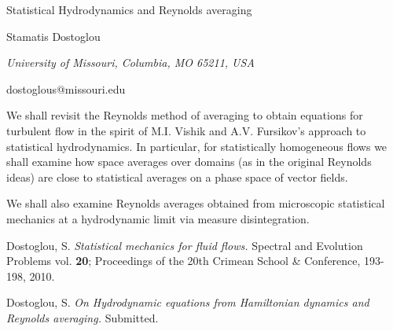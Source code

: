 \documentclass[10pt,a4paper]{article}
\begin{document}
\begin{center}

{\Large Statistical Hydrodynamics and Reynolds averaging}

\bigskip

{\sc Stamatis Dostoglou}

{\small\it University of Missouri, Columbia, MO 65211, USA}

{\small\rm dostoglous@missouri.edu}


\end{center}

\bigskip


We shall revisit the Reynolds method of averaging to obtain equations
for turbulent flow in the spirit of M.I. Vishik and A.V. Fursikov's approach to statistical hydrodynamics. In particular, 
for statistically homogeneous flows we shall examine how space averages over domains (as in the original Reynolds ideas) are close to statistical averages on a phase space of vector fields.

We shall also examine Reynolds averages obtained from microscopic statistical mechanics at a hydrodynamic limit via measure disintegration.

\begin{thebibliography}{7}

Dostoglou, S.
{\em Statistical mechanics for fluid flows.} 
Spectral and Evolution
Problems  vol. {\bf 20}; Proceedings of the 20th Crimean School \& Conference, 193-198, 2010.

Dostoglou, S.
{\em On Hydrodynamic equations from Hamiltonian dynamics
and 
Reynolds averaging.} Submitted.

\end{thebibliography}
\end{document}
